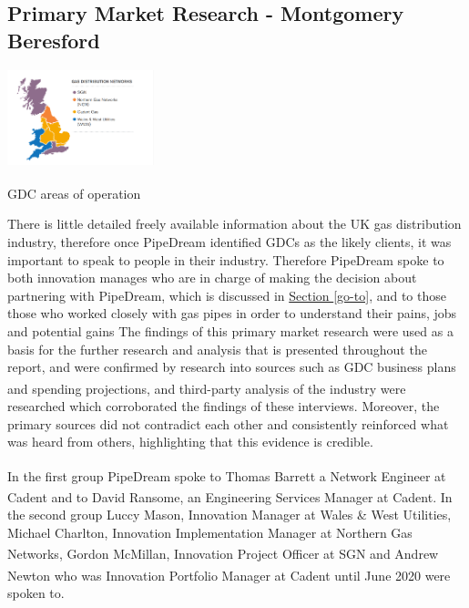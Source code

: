 \documentclass[11pt]{article}		%
\newcommand{\supercite}[1]{\textsuperscript{\cite{#1}}}		%
\newcommand{\sectref}[1]{\hyperref[#1]{Section \ref*{#1}}}     %
\begin{document}
        \subsection[Primary Market Research]{Primary Market Research - Montgomery Beresford} \label{primaryresearch}
            \begin{floatingfigure}[r]{0.4\textwidth}
    		    \centering
    	    	\includegraphics[width=0.32\textwidth]{distribution}
    		    \caption{GDC areas of operation\supercite{Gas_Distribution_Industry}}
        	    \label{distrit0}
    	    \end{floatingfigure}
            There is little detailed freely available information about the UK gas distribution industry, therefore once PipeDream identified GDCs as the likely clients, it was important to speak to people in their industry. Therefore PipeDream spoke to both innovation manages who are in charge of making the decision about partnering with PipeDream, which is discussed in \sectref{go-to}, and to those those who worked closely with gas pipes in order to understand their pains, jobs and potential gains
             The findings of this primary market research were used as a basis for the further research and analysis that is presented throughout the report, and were confirmed by research into sources such as GDC business plans and spending projections\supercite{SGN-GD2}, and third-party analysis of the industry\supercite{Gas_Distribution_Industry} were researched which corroborated the findings of these interviews. Moreover, the primary sources did not contradict each other and consistently reinforced what was heard from others, highlighting that this evidence is credible.
	        \begin{floatingfigure}[r]{0pt} \end{floatingfigure}
	        \vspace*{-\baselineskip}
            \hspace*{2ex}In the first group PipeDream spoke to Thomas Barrett\supercite{Barret} a Network Engineer at Cadent and to David Ransome\supercite{Ransome}, an Engineering Services Manager at Cadent. In the second group Luccy Mason, Innovation Manager at Wales \& West Utilities, Michael Charlton, Innovation Implementation Manager at Northern Gas Networks, Gordon McMillan\supercite{McMillan}, Innovation Project Officer at SGN and Andrew Newton\supercite{Newton} who was Innovation Portfolio Manager at Cadent until June 2020 were spoken to.
\end{document}

